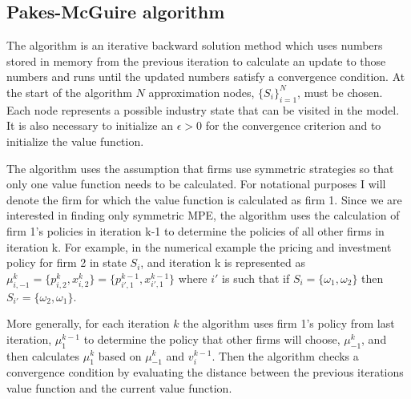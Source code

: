 \documentclass[12pt]{article}
\begin{document}
\subsection{Pakes-McGuire algorithm}


The \citet{1992_Pakes_McGuire_NBER} algorithm is an iterative backward solution method which uses numbers stored in memory from the previous iteration to calculate an update to those numbers and runs until the updated numbers satisfy a convergence condition. At the start of the algorithm $N$ approximation nodes, $\{S_i\}_{i=1}^N$, must be chosen. Each node represents a possible industry state that can be visited in the model. It is also necessary to initialize an $\epsilon>0$ for the convergence criterion and to initialize the value function.

The algorithm uses the assumption that firms use symmetric strategies so that only one value function needs to be calculated. For notational purposes I will denote the firm for which the value function is calculated as firm 1. Since we are interested in finding only symmetric MPE, the \citet{1992_Pakes_McGuire_NBER} algorithm uses the calculation of firm 1's policies in iteration k-1 to determine the policies of all other firms in iteration k. For example, in the numerical example the pricing and investment policy for firm 2 in state $S_i$, and iteration k is represented as $\mu^k_{i,-1}=\{p^{k}_{i,2},x^k_{i,2}\}=\{p^{k-1}_{i',1},x^{k-1}_{i',1}\}$ where $i'$ is such that if $S_i=\{\omega_1,\omega_2\}$ then $S_{i'}=\{\omega_2,\omega_1\}$.

More generally, for each iteration $k$ the algorithm uses firm 1's policy from last iteration, $\mu^{k-1}_1$ to determine the policy that other firms will choose, $\mu^k_{-1}$, and then calculates $\mu^k_1$ based on $\mu^k_{-1}$ and $v_i^{k-1}$. Then the algorithm checks a convergence condition by evaluating the distance between the previous iterations value function and the current value function.
\end{document}
